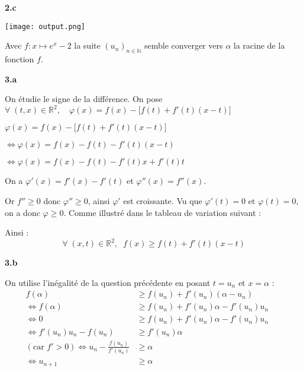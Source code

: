 \documentclass[11pt]{article}
\newcommand{\bfrac}[2]{\displaystyle\frac{#1}{#2}}
\newcommand{\N}{\mathbb{N}}
\newcommand{\R}{\mathbb{R}}
\begin{document}
\vspace{15px}
\textbf{2.c}

\vspace{-25px}
\begin{center}
\texttt{[image: output.png]}
\end{center}

\noindent Avec $f: x \mapsto e^x - 2$ la suite $(u_n)_{n\in \N}$ semble converger vers $\alpha$ la racine de la fonction $f$.

\newpage
\textbf{3.a}

\noindent On étudie le signe de la différence.
\noindent On pose $\forall \; (t, x) \in \R^2, \quad \varphi(x) = f(x) - \big[f(t)+f'(t)(x-t)\big]$

$\varphi(x) = f(x) - \big[f(t)+f'(t)(x-t)\big]$

$\Leftrightarrow \varphi(x) = f(x)-f(t)-f'(t)(x-t)$

$\Leftrightarrow \varphi(x) = f(x)-f(t)-f'(t)x+f'(t)t$

\noindent On a $\varphi'(x) = f'(x)-f'(t)$ et  $\varphi''(x) = f''(x)$.

\noindent Or $f''\geq0$ donc $\varphi''\geq0$, ainsi $\varphi'$ est croissante. Vu que $\varphi'(t) = 0$ et $\varphi(t) = 0$, on a donc $\varphi \geq 0$. Comme illustré dans le tableau de variation suivant :

\vspace{8px}
\begin{center}
\end{center}
\vspace{12px}
\noindent Ainsi :
\vspace{-12px}
\[\boxed{\forall\; (x, t) \in \R^2, \;\; f(x) \geq f(t) + f'(t)(x-t)}\]

\vspace{12px}
\textbf{3.b}

\noindent On utilise l'inégalité de la question précédente en posant $t = u_n$ et $x= \alpha$ :
\begin{align*}
f(\alpha) &\geq f(u_n) + f'(u_n)(\alpha-u_n) &&\\
\Leftrightarrow f(\alpha) &\geq f(u_n)+f'(u_n)\alpha - f'(u_n)u_n &&\\
\Leftrightarrow 0 &\geq f(u_n) + f'(u_n)\alpha - f'(u_n)u_n &&\\
\Leftrightarrow f'(u_n)u_n - f(u_n) &\geq f'(u_n)\alpha &&\\
(\text{car } f' > 0 ) \Leftrightarrow u_n - \bfrac{f(u_n)}{f'(u_n)} &\geq \alpha &&\\
\Leftrightarrow u_{n+1} &\geq \alpha
\end{align*}
\end{document}
